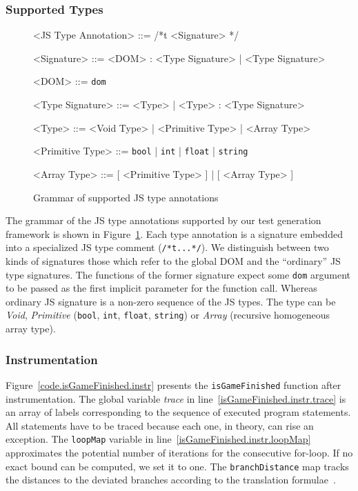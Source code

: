 \documentclass[sigconf]{acmart}
\begin{document}
\subsubsection{Supported Types}
\label{sub.sec.sup.types}

\begin{figure}[t]
\setlength{\grammarparsep}{3pt}
\small
\begin{grammar}

<JS Type Annotation> ::= /*t <Signature> */

<Signature> ::= <DOM> : <Type Signature> | <Type Signature>

<DOM> ::= \texttt{dom}

<Type Signature> ::= <Type> | <Type> : <Type Signature>

<Type> ::= <Void Type> | <Primitive Type> | <Array Type>

<Primitive Type> ::= \texttt{bool} | \texttt{int} | \texttt{float} | \texttt{string}

<Array Type> ::= [ <Primitive Type> ] | [ <Array Type> ]
\end{grammar}
\caption{Grammar of supported JS type annotations}
\label{fig.js.type.annot}
\end{figure}

The grammar of the JS type annotations supported by our test generation framework is shown in Figure~\ref{fig.js.type.annot}. Each type annotation is a signature embedded into a specialized JS type comment (\texttt{/*t...*/}). We distinguish between two kinds of signatures those which refer to the global DOM and the ``ordinary'' JS type signatures. The functions of the former signature expect some \texttt{dom} argument to be passed as the first implicit parameter for the function call. Whereas ordinary JS signature is a non-zero sequence of the JS types. The type can be \emph{Void}, \emph{Primitive} (\texttt{bool}, \texttt{int}, \texttt{float}, \texttt{string}) or \emph{Array} (recursive homogeneous array type).  

\subsubsection{Instrumentation}
\label{sub.sec.instrument}

Figure~\ref{code.isGameFinished.instr} presents the \texttt{isGameFinished} function after instrumentation. The global variable \emph{trace} in line~\ref{isGameFinished.instr.trace} is an array of labels corresponding to the sequence of executed program statements. All statements have to be traced because each one, in theory, can rise an exception. The \texttt{loopMap} variable in line~\ref{isGameFinished.instr.loopMap} approximates the potential number of iterations for the consecutive for-loop. If no exact bound can be computed, we set it to one. The \texttt{branchDistance} map tracks the distances to the deviated branches according to the translation formulae~\cite{tracey1998automated}.  
\end{document}
